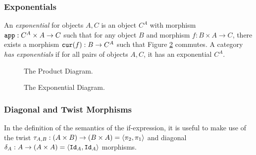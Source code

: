 \subsubsection{Exponentials}
An \textit{exponential} for objects $A, C$ is an object $C^A$ with morphism $\texttt{app}: C^A\times A \rightarrow C$ such that for any object $B$ and morphism $f: B\times A \rightarrow C$, there exists a morphism $\texttt{cur}(f): B \rightarrow C^A$ such that Figure \ref{ExponentialDiagram} commutes. A category \textit{has exponentials} if for all pairs of objects $A, C$, it has an exponential $C^A$.

\begin{minipage}{0.47\linewidth}
    \begin{figure}[H]
        \begin{framed}
            \centering
            \begin{center}
            \end{center}
        \end{framed}
        \caption{The Product Diagram.}
        \label{ProductDiagram}
    \end{figure}
\end{minipage}\quad
\begin{minipage}{0.47\linewidth}
    \begin{figure}[H]
        \begin{framed}
            \centering
            \begin{center}
            \end{center}
        \end{framed}
        \caption{The Exponential Diagram.}
        \label{ExponentialDiagram}
    \end{figure}
\end{minipage}


\subsubsection{Diagonal and Twist Morphisms}
In the definition of the semantics of the if-expression, it is useful to make use of the twist $\tau_{A, B}: (A\times B) \rightarrow (B\times A) = \langle\pi_2, \pi_1\rangle$ and diagonal $\delta_{A}: A \rightarrow (A\times A)  = \langle\texttt{Id}_{A}, \texttt{Id}_{A}\rangle$ morphisms.

